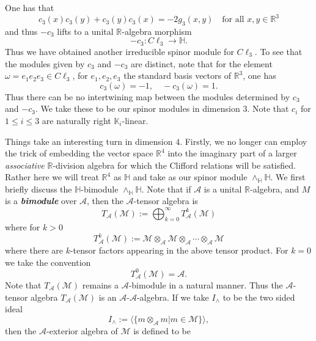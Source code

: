 \documentclass[openany, 11pt]{article}
\theoremstyle{definition}
\theoremstyle{remark}
\def\la{\ensuremath{\langle}}
\def\ra{\ensuremath{\rangle}}
\def\bH{\ensuremath{\mathbb{H}}}
\def\bR{\ensuremath{\mathbb{R}}}
\def\bK{\ensuremath{\mathbb{K}}}
\begin{document}
One has that
\[
    c_3(x)c_3(y)+c_3(y)c_3(x)=-2g_3(x,y)\quad\text{for all }x,y\in\bR^3
\]
and thus $-c_3$ lifts to a unital $\bR$-algebra morphism
\[
    -c_3:C\ell_3\rightarrow\bH.
\]
Thus we have obtained another irreducible spinor module for $C\ell_3$. To see that the modules given by $c_3$ and $-c_3$ are distinct, note that for the element $\omega=e_1e_2e_3\in C\ell_3$, for $e_1,e_2,e_3$ the standard basis vectors of $\bR^3$, one has
\[
    c_3(\omega)=-1,\quad -c_3(\omega)=1.
\]
Thus there can be no intertwining map between the modules determined by $c_3$ and $-c_3$. We take these to be our spinor modules in dimension $3$. Note that $c_i$ for $1\leq i\leq 3$ are naturally right $\bK_i$-linear.\par
Things take an interesting turn in dimension $4$. Firstly, we no longer can employ the trick of embedding the vector space $\bR^4$ into the imaginary part of a larger \emph{associative} $\bR$-division algebra for which the Clifford relations will be satisfied. Rather here we will treat $\bR^4$ as $\bH$ and take as our spinor module $\wedge_{\bH}\bH$. We first briefly discuss the $\bH$-bimodule $\wedge_{\bH}\bH$. Note that if $\mathcal{A}$ is a unital $\bR$-algebra, and $M$ is a \textbf{\emph{bimodule}} over $\mathcal{A}$, then the $\mathcal{A}$-tensor algebra is
\[
    T_{\mathcal{A}}(\mathcal{M}):=\bigoplus_{k=0}^{\infty}T^k_{\mathcal{A}}(\mathcal{M})
\]
where for $k>0$
\[
    T^k_{\mathcal{A}}(\mathcal{M}):=\mathcal{M}\otimes_{\mathcal{A}}\mathcal{M}\otimes_{\mathcal{A}}\cdots\otimes_{\mathcal{A}}\mathcal{M}
\]
where there are $k$-tensor factors appearing in the above tensor product. For $k=0$ we take the convention
\[
    T^0_{\mathcal{A}}(\mathcal{M})=\mathcal{A}.
\]
Note that $T_{\mathcal{A}}(\mathcal{M})$ remains a $\mathcal{A}$-bimodule in a natural manner. Thus the $\mathcal{A}$-tensor algebra $T_{\mathcal{A}}(\mathcal{M})$ is an $\mathcal{A}$-$\mathcal{A}$-algebra. If we take $I_{\wedge}$ to be the two sided ideal
\[
    I_{\wedge}:=\la\bigl\{m\otimes_{\mathcal{A}}m\big|m\in\mathcal{M}\bigr\}\ra,
\]
then the $\mathcal{A}$-exterior algebra of $\mathcal{M}$ is defined to be 
\end{document}
